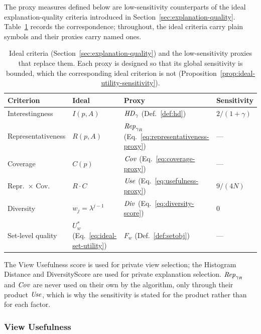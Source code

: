 The proxy measures defined below are low-sensitivity counterparts of the ideal explanation-quality criteria introduced in Section~\ref{sec:explanation-quality}.
Table~\ref{tab:ideal-vs-proxy} records the correspondence; throughout, the ideal criteria carry plain symbols and their proxies carry named ones.

\begin{table}[t]
\centering
\small
\caption{Ideal criteria (Section~\ref{sec:explanation-quality}) and the low-sensitivity proxies that replace them. Each proxy is designed so that its global sensitivity is bounded, which the corresponding ideal criterion is not (Proposition~\ref{prop:ideal-utility-sensitivity}).}
\label{tab:ideal-vs-proxy}
\begin{tabular}{@{}llll@{}}
\toprule
Criterion & Ideal & Proxy & Sensitivity \\
\midrule
Interestingness    & $I(p,A)$ & $\mathit{HD}_\gamma$ (Def.~\ref{def:hd})              & $2/(1{+}\gamma)$ \\
Representativeness & $R(p,A)$ & $\mathit{Rep}_{\gamma_R}$ (Eq.~\eqref{eq:representativeness-proxy}) & --- \\
Coverage           & $C(p)$   & $\mathit{Cov}$ (Eq.~\eqref{eq:coverage-proxy})        & --- \\
Repr.\ $\times$ Cov.\ & $R\cdot C$ & $\mathit{Use}$ (Eq.~\eqref{eq:usefulness-proxy})   & $9/(4N)$ \\
Diversity          & $w_j=\lambda^{j-1}$ & $\mathit{Div}$ (Eq.~\eqref{eq:diversity-score}) & $0$ \\
Set-level quality  & $U^*_w$ (Eq.~\eqref{eq:ideal-set-utility}) & $F_w$ (Def.~\ref{def:setobj}) & --- \\
\bottomrule
\end{tabular}
\end{table}

The View Usefulness score is used for private view selection; the Histogram Distance and DiversityScore are used for private explanation selection.
$\mathit{Rep}_{\gamma_R}$ and $\mathit{Cov}$ are never used on their own by the algorithm, only through their product $\mathit{Use}$, which is why the sensitivity is stated for the product rather than for each factor.

\subsubsection{View Usefulness}
\label{subsubsec:view-usefulness}

